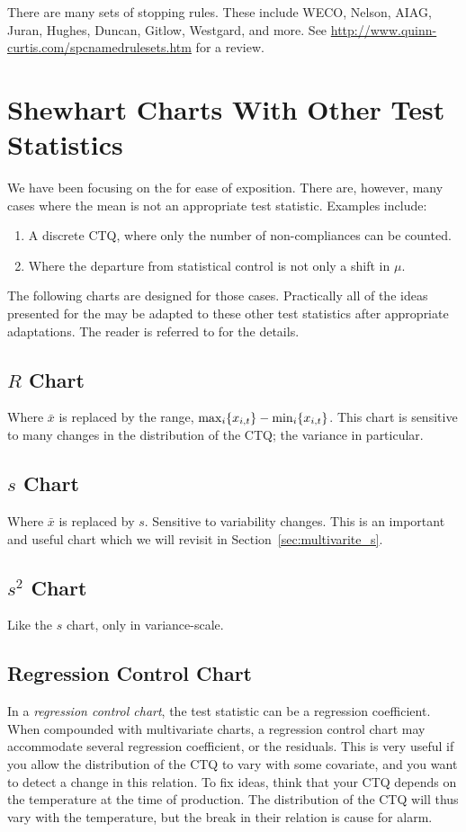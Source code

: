 \begin{extra}
There are many sets of stopping rules. 
These include WECO, Nelson, AIAG, Juran, Hughes, Duncan, Gitlow, Westgard, and more. 
See \url{http://www.quinn-curtis.com/spcnamedrulesets.htm} for a review.
\end{extra}







\section{Shewhart Charts With Other Test Statistics}

We have been focusing on the \barxChart for ease of exposition. There are, however, many cases where the mean is not an appropriate test statistic.
Examples include:
\begin{enumerate}
\item A discrete CTQ, where only the number of non-compliances can be counted. 
\item Where the departure from statistical control is not only a shift in $\mu$. 
\end{enumerate}

The following charts are designed for those cases. 
Practically all of the ideas presented for the \barxChart may be adapted to these other test statistics after appropriate adaptations. 
The reader is referred to \cite{montgomery_introduction_2007} for the details. 

\label{sec:other_control_charts}
\subsection{$R$ Chart}
Where $\bar{x}$ is replaced by the range, $\max_i\{ x_{i,t} \}-\min_i\{ x_{i,t} \}$.
This chart is sensitive to many changes in the distribution of the CTQ; the variance in particular. 
\subsection{$s$ Chart}
Where $\bar{x}$ is replaced by $s$. 
Sensitive to variability changes. 
This is an important and useful chart which we will revisit in Section~\ref{sec:multivarite_s}.
\subsection{$s^2$ Chart}
Like the $s$ chart, only in variance-scale.
\subsection{Regression Control Chart}
In a \emph{regression control chart}, the test statistic can be a regression coefficient. 
When compounded with multivariate charts, a regression control chart may accommodate several regression  coefficient, or the residuals. 
This is very useful if you allow the distribution of the CTQ to vary with some covariate, and you want to detect a change in this relation. 
To fix ideas, think that your CTQ depends on the temperature at the time of production. The distribution of the CTQ will thus vary with the temperature, but the break in their relation is cause for alarm.
